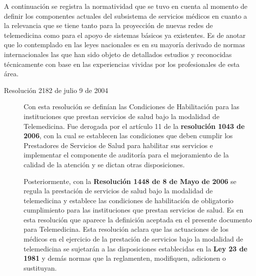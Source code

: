 A continuación se registra la normatividad que se tuvo en cuenta al momento de definir los componentes actuales del subsistema de servicios médicos en cuanto a la relevancia que se tiene tanto para la proyección de nuevas redes de telemedicina como para el apoyo de sistemas básicos ya existentes. Es de anotar que lo contemplado en las leyes nacionales es en su mayoría derivado de normas internacionales las que han sido objeto de detallados estudios y  reconocidas técnicamente con base en las experiencias vividas por los profesionales de esta área. 

\begin{description}
\item[Resolución 2182 de julio 9 de 2004] Con esta resolución se definían las Condiciones de Habilitación para las instituciones que prestan servicios de salud bajo la modalidad de Telemedicina. Fue derogada por el artículo 11 de la \textbf{resolución 1043 de 2006}, con la cual se establecen las condiciones que deben cumplir los Prestadores de Servicios de Salud para habilitar sus servicios e implementar el componente de auditoría para el mejoramiento de la calidad de la atención y se dictan otras disposiciones. 

Posteriormente, con la \textbf{Resolución 1448 de 8 de Mayo de 2006} se regula la prestación de servicios de salud bajo la modalidad de telemedicina y establece las condiciones de habilitación de obligatorio cumplimiento para las instituciones que prestan servicios de salud. Es en esta resolución que aparece la definición aceptada en el presente documento para Telemedicina. Esta resolución aclara que las actuaciones de los médicos en el ejercicio de la prestación de servicios bajo la modalidad de telemedicina se sujetarán a las disposiciones establecidas en la \textbf{Ley 23 de 1981} y demás normas que la reglamenten, modifiquen, adicionen o sustituyan.


\end{description}
